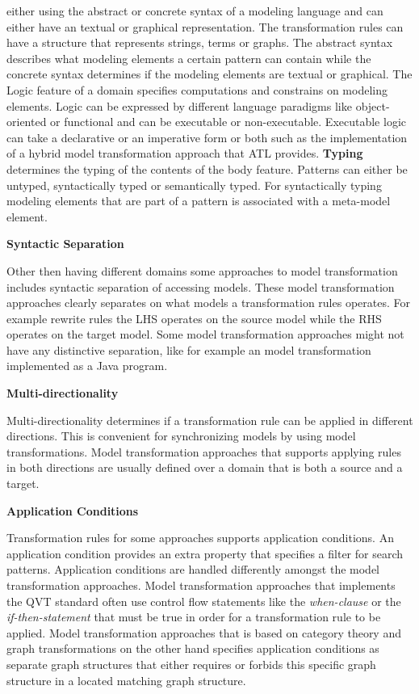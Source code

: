 either using the abstract or concrete syntax of a modeling language and can
either have an textual or graphical representation. The transformation rules can
have a structure that represents strings, terms or graphs. The abstract syntax
describes what modeling elements a certain pattern can contain while the
concrete syntax determines if the modeling elements are textual or graphical.
The Logic feature of a domain specifies computations and constrains on modeling
elements. Logic can be expressed by different language paradigms like
object-oriented or functional and can be executable or non-executable.
Executable logic can take a declarative or an imperative form or both such as
the implementation of a hybrid model transformation approach that ATL provides. 
\textbf{Typing} determines the typing of the contents of the body feature.
Patterns can either be untyped, syntactically typed or semantically typed. For
syntactically typing modeling elements that are part of a pattern is associated
with a meta-model element.

\textbf{Syntactic Separation}

Other then having different domains some approaches to model transformation
includes syntactic separation of accessing models. These model transformation
approaches clearly separates on what models a transformation rules operates.
For example rewrite rules the LHS operates on the source model while the RHS
operates on the target model. Some model transformation approaches might not
have any distinctive separation, like for example an model transformation
implemented as a Java program.

\textbf{Multi-directionality}

Multi-directionality determines if a transformation rule can be applied in
different directions. This is convenient for synchronizing models by using model
transformations. Model transformation approaches that supports
applying rules in both directions are usually defined over a domain that is
both a source and a target.


\textbf{Application Conditions}

Transformation rules for some approaches supports application conditions. An
application condition provides an extra property that specifies a filter for
search patterns. Application conditions are handled differently amongst the
model transformation approaches. Model transformation approaches that implements
the QVT standard often use control flow statements like the \textit{when-clause}
or the \textit{if-then-statement} that must be true in order for a
transformation rule to be applied. Model transformation approaches that is
based on category theory and graph transformations on the other hand specifies
application conditions as separate graph structures that either requires or
forbids this specific graph structure in a located matching graph structure. 

